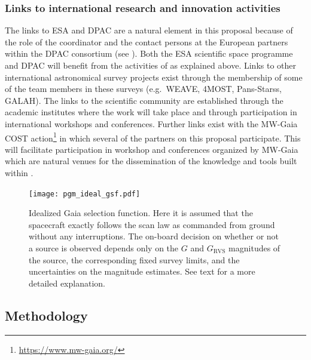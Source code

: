 \subsubsection{Links to international research and innovation activities}
\label{sec:linksinternational}

The links to ESA and DPAC are a natural element in this proposal because of the role of the coordinator and the contact persons at the European partners within the DPAC consortium (see ). Both the ESA scientific space programme and DPAC will benefit from the activities of {\acro} as explained above. Links to other international astronomical survey projects exist through the membership of some of the {\acro} team members in these surveys (e.g.\ WEAVE, 4MOST, Pans-Starss, GALAH). The links to the scientific community are established through the academic institutes where the work will take place and through participation in international workshops and conferences. Further links exist with the MW-Gaia COST action\footnote{\url{https://www.mw-gaia.org/}} in which several of the partners on this proposal participate. This will facilitate participation in workshop and conferences organized by MW-Gaia which are natural venues for the dissemination of the knowledge and tools built within {\acro}.

\begin{figure}[t]
    \centering
    \texttt{[image: pgm\_ideal\_gsf.pdf]}
    \caption{Idealized Gaia selection function. Here it is assumed that the spacecraft exactly follows the scan law as commanded from ground without any interruptions. The on-board decision on whether or not a source is observed depends only on the $G$ and $G_\mathrm{RVS}$ magnitudes of the source, the corresponding fixed survey limits, and the uncertainties on the magnitude estimates. See text for a more detailed explanation.}
    \label{fig:gsf_ideal}
\end{figure}

\subsection{Methodology}
\label{sec:methods}

